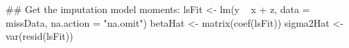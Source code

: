 \begin{Schunk}
\begin{Sinput}
 ## Get the imputation model moments:
 lsFit <- lm(y ~ x + z, 
             data = missData, 
             na.action = "na.omit")
 betaHat <- matrix(coef(lsFit))
 sigma2Hat <- var(resid(lsFit))
\end{Sinput}
\end{Schunk}
